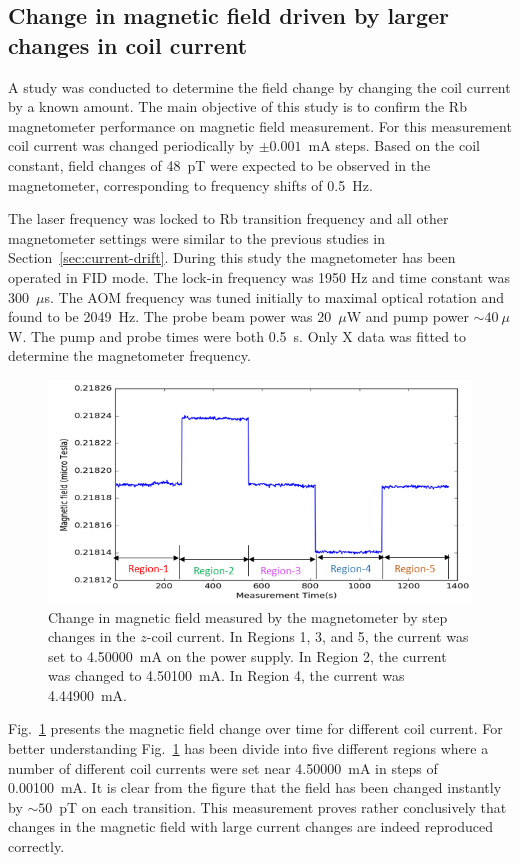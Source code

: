 \subsection{Change in magnetic field driven by larger changes in coil current}

A study was conducted to determine the field change by changing the
coil current by a known amount. The main objective of this study is to
confirm the Rb magnetometer performance on magnetic field measurement.
For this measurement coil current was changed periodically by $\pm
0.001$~mA steps.  Based on the coil constant, field changes of 48~pT
were expected to be observed in the magnetometer, corresponding to
frequency shifts of 0.5~Hz.

The laser frequency was locked to Rb transition frequency and all
other magnetometer settings were similar to the previous studies in
Section~\ref{sec:current-drift}.  During this study the magnetometer
has been operated in FID mode.  The lock-in frequency was 1950 Hz and
time constant was 300~$\mu$s.  The AOM frequency was tuned initially
to maximal optical rotation and found to be 2049~Hz.  The probe beam
power was 20~$\mu$W and pump power $\sim 40~\mu$W.  The pump and probe
times were both 0.5~s.  Only X data was fitted to determine the
magnetometer frequency.

\begin{figure}%
\centering
\includegraphics[width=0.7\linewidth]{figures/field_change_with_current}  
\caption{Change in magnetic field measured by the magnetometer by step
  changes in the $z$-coil current.  In Regions 1, 3, and 5, the
  current was set to 4.50000~mA on the power supply.  In Region 2, the
  current was changed to 4.50100~mA.  In Region 4, the current was
  4.44900~mA.\label{fig:field-change}}
\end{figure} 
 
Fig.~\ref{fig:field-change} presents the magnetic field change over
time for different coil current. For better understanding
Fig.~\ref{fig:field-change} has been divide into five different
regions where a number of different coil currents were set near
4.50000~mA in steps of 0.00100~mA.  It is clear from the figure that
the field has been changed instantly by $\sim 50$~pT on each
transition.  This measurement proves rather conclusively that changes
in the magnetic field with large current changes are indeed reproduced
correctly.


